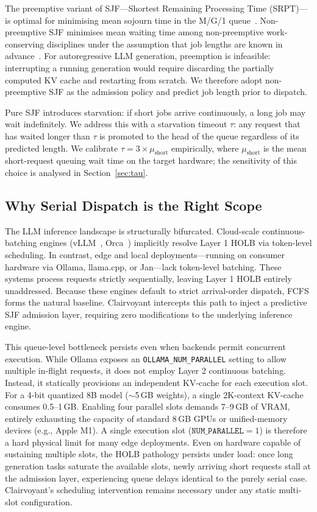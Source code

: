 \documentclass[10pt]{article}
\begin{document}
The preemptive variant of SJF—Shortest Remaining Processing Time (SRPT)—is optimal for minimising mean sojourn time in the M/G/1 queue~\cite{schrage1968proof}. Non-preemptive SJF minimises mean waiting time among non-preemptive work-conserving disciplines under the assumption that job lengths are known in advance~\cite{kleinrock1975queueing}. For autoregressive LLM generation, preemption is infeasible: interrupting a running generation would require discarding the partially computed KV cache and restarting from scratch. We therefore adopt non-preemptive SJF as the admission policy and predict job length prior to dispatch.

Pure SJF introduces starvation: if short jobs arrive continuously, a long job may wait indefinitely. We address this with a starvation timeout $\tau$: any request that has waited longer than $\tau$ is promoted to the head of the queue regardless of its predicted length. We calibrate $\tau = 3 \times \mu_{\text{short}}$ empirically, where $\mu_{\text{short}}$ is the mean short-request queuing wait time on the target hardware; the sensitivity of this choice is analysed in Section~\ref{sec:tau}.

\subsection{Why Serial Dispatch is the Right Scope}
\label{sec:scope}

The LLM inference landscape is structurally bifurcated. Cloud-scale continuous-batching engines (vLLM~\cite{kwon2023efficient}, Orca~\cite{yu2022orca}) implicitly resolve Layer 1 HOLB via token-level scheduling. In contrast, edge and local deployments—running on consumer hardware via Ollama, llama.cpp, or Jan—lack token-level batching. These systems process requests strictly sequentially, leaving Layer 1 HOLB entirely unaddressed. Because these engines default to strict arrival-order dispatch, FCFS forms the natural baseline. Clairvoyant intercepts this path to inject a predictive SJF admission layer, requiring zero modifications to the underlying inference engine.

This queue-level bottleneck persists even when backends permit concurrent execution. While Ollama exposes an \texttt{OLLAMA\_NUM\_PARALLEL} setting to allow multiple in-flight requests, it does not employ Layer 2 continuous batching. Instead, it statically provisions an independent KV-cache for each execution slot. For a 4-bit quantized 8B model ($\sim$5\,GB weights), a single 2K-context KV-cache consumes 0.5–1\,GB. Enabling four parallel slots demands 7–9\,GB of VRAM, entirely exhausting the capacity of standard 8\,GB GPUs or unified-memory devices (e.g., Apple M1). A single execution slot ($\texttt{NUM\_PARALLEL}=1$) is therefore a hard physical limit for many edge deployments. Even on hardware capable of sustaining multiple slots, the HOLB pathology persists under load: once long generation tasks saturate the available slots, newly arriving short requests stall at the admission layer, experiencing queue delays identical to the purely serial case. Clairvoyant's scheduling intervention remains necessary under any static multi-slot configuration.
\end{document}
